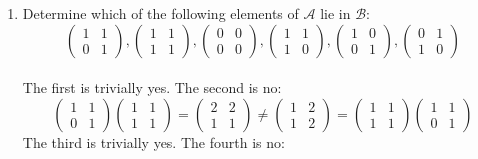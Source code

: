 \begin{enumerate}
    \item Determine which of the following elements of $\mathcal{A}$ lie in $\mathcal{B}$:
    \[
        \begin{pmatrix}
            1&1\\0&1
        \end{pmatrix},
        \begin{pmatrix}
            1&1\\1&1
        \end{pmatrix},
        \begin{pmatrix}
        0&0\\0&0
    \end{pmatrix},
    \begin{pmatrix}
        1&1\\1&0
    \end{pmatrix},
    \begin{pmatrix}
        1&0\\0&1
    \end{pmatrix},
    \begin{pmatrix}
        0&1\\1&0
    \end{pmatrix}
    \]
    \ \\The first is trivially yes.
    The second is no:
    \[
    \begin{pmatrix}
            1&1\\0&1
        \end{pmatrix}
        \begin{pmatrix}
            1&1\\1&1
        \end{pmatrix}
        =
        \begin{pmatrix}
            2&2\\1&1
        \end{pmatrix}
        \neq
        \begin{pmatrix}
            1&2\\1&2
        \end{pmatrix}
        =
        \begin{pmatrix}
            1&1\\1&1
        \end{pmatrix}
        \begin{pmatrix}
            1&1\\0&1
        \end{pmatrix}
    \]
    The third is trivially yes.
    The fourth is no:

\end{enumerate}
